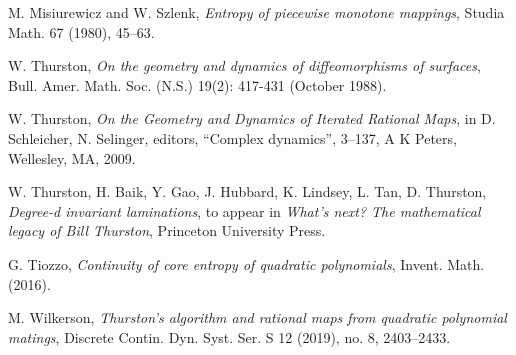 \documentclass[11pt]{amsart}
\begin{document}
\begin{thebibliography}{99}
M. Misiurewicz and W. Szlenk, 
\emph{Entropy of piecewise monotone mappings}, 
Studia Math. 67 (1980), 45--63.

W. Thurston, \emph{On the geometry and dynamics of diffeomorphisms of surfaces}, 
Bull. Amer. Math. Soc. (N.S.) 19(2): 417-431 (October 1988).

W. Thurston, \emph{On the Geometry and Dynamics of Iterated Rational Maps}, 
in D. Schleicher, N. Selinger, editors, ``Complex dynamics'', 3--137, A K Peters, Wellesley, MA, 2009. 

W. Thurston, H. Baik, Y. Gao, J. Hubbard, K. Lindsey, L. Tan, D. Thurston,
\textit{Degree-d invariant laminations}, to appear in \emph{What's next? The mathematical legacy of Bill Thurston}, Princeton University Press.

G. Tiozzo, \emph{Continuity of core entropy of quadratic polynomials},
Invent. Math. (2016).

M. Wilkerson, \emph{Thurston's algorithm and rational maps from quadratic polynomial matings},
Discrete Contin. Dyn. Syst. Ser. S 12 (2019), no. 8, 2403--2433.


\end{thebibliography}
\end{document}
